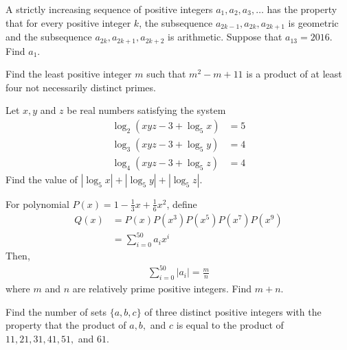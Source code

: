 \begin{problem}
	A strictly increasing sequence of positive integers $a_1, a_2, a_3, \ldots$ has the property that for every positive integer $k$, the subsequence $a_{2k-1}, a_{2k}, a_{2k+1}$ is geometric and the subsequence $a_{2k}, a_{2k+1}, a_{2k+2}$ is arithmetic. Suppose that $a_{13} = 2016$. Find $a_1$. %
\end{problem}

\begin{problem}
	Find the least positive integer $m$ such that $m^2 - m + 11$ is a product of at least four not necessarily distinct primes. %
\end{problem}

\begin{problem}
	Let $x,y$ and $z$ be real numbers satisfying the system
		\begin{align*}
			\log_2(xyz-3+\log_5 x) &= 5\\
			\log_3(xyz-3+\log_5 y) &= 4 \\
			\log_4(xyz-3+\log_5 z) &= 4
		\end{align*}
	Find the value of $|\log_5 x|+|\log_5 y|+|\log_5 z|$. %
\end{problem}

\begin{problem}
	For polynomial $P(x)=1-\frac{1}{3}x+\frac{1}{6}x^2$, define
		\begin{align*}
			Q(x)
				& = P(x)P(x^3)P(x^5)P(x^7)P(x^9)\\
				& = \sum\limits_{i=0}^{50}a_ix^i
		\end{align*}
	Then,
		\begin{align*}
			\sum\limits_{i=0}^{50}|a_i|=\frac{m}{n}
		\end{align*}
	where $m$ and $n$ are relatively prime positive integers. Find $m+n$. %
\end{problem}

\begin{problem}
	Find the number of sets $\{a,b,c\}$ of three distinct positive integers with the property that the product of $a,b,$ and $c$ is equal to the product of $11,21,31,41,51,$ and $61$. %
\end{problem}

